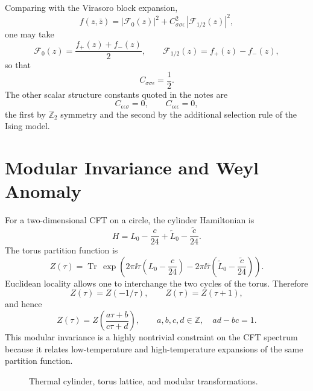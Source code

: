 Comparing with the Virasoro block expansion,
\[
  f(z,\bar z)
  =
  |\mathcal F_0(z)|^2
  +
  C_{\sigma\sigma\epsilon}^2\,|\mathcal F_{1/2}(z)|^2,
\]
one may take
\[
  \mathcal F_0(z)=\frac{f_+(z)+f_-(z)}2,
  \qquad
  \mathcal F_{1/2}(z)=f_+(z)-f_-(z),
\]
so that
\[
  C_{\sigma\sigma\epsilon}=\frac12.
\]
The other scalar structure constants quoted in the notes are
\[
  C_{\epsilon\epsilon\sigma}=0,\qquad
  C_{\epsilon\epsilon\epsilon}=0,
\]
the first by \(\mathbb Z_2\) symmetry and the second by the additional
selection rule of the Ising model.

\section{Modular Invariance and Weyl Anomaly}

For a two-dimensional CFT on a circle, the cylinder Hamiltonian is
\[
  H=L_0-\frac c{24}+\widetilde L_0-\frac{\widetilde c}{24}.
\]
The torus partition function is
\[
  Z(\tau)=\operatorname{Tr}\,
  \exp\left(2\pi\ii\tau\left(L_0-\frac c{24}\right)
  -2\pi\ii\bar\tau\left(\widetilde L_0-\frac{\widetilde c}{24}\right)\right).
\]
Euclidean locality allows one to interchange the two cycles of the
torus.  Therefore
\[
  Z(\tau)=Z(-1/\tau),
  \qquad
  Z(\tau)=Z(\tau+1),
\]
and hence
\[
  Z(\tau)=Z\left(\frac{a\tau+b}{c\tau+d}\right),
  \qquad
  a,b,c,d\in\mathbb Z,\quad ad-bc=1.
\]
This modular invariance is a highly nontrivial constraint on the CFT
spectrum because it relates low-temperature and high-temperature
expansions of the same partition function.

\begin{figure}[htbp]
\centering
{}
\caption{Thermal cylinder, torus lattice, and modular transformations.}
\end{figure}

